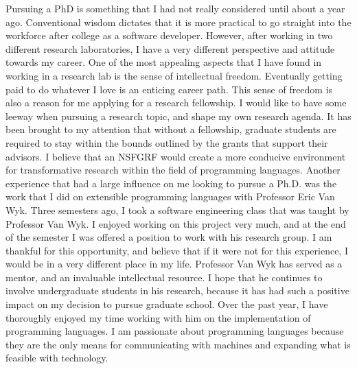 \documentclass[a4paper,12pt]{article}
\newcommand{\tab}{\hspace*{2em}}
\begin{document}
Pursuing a PhD is something that I had not really considered until about a year ago. Conventional wisdom dictates that it is  more practical to go straight into the workforce after college as a software developer. However, after working in two different research laboratories, I have a very different perspective and attitude towards my career. One of the most appealing aspects that I have found in working in a research lab is the sense of intellectual freedom.  Eventually getting paid to do whatever I love is an enticing career path. This sense of freedom is also a reason for me applying for a research fellowship. I would like to have some leeway when pursuing a research topic, and shape my own research agenda. It has been brought to my attention that without a fellowship, graduate students are required to stay within the bounds outlined by the grants that support their advisors. I believe that an NSFGRF would create a more conducive environment for transformative research within the field of programming languages.
\newline
\tab Another experience that had a large influence on me looking to pursue a Ph.D. was the work that I did on extensible programming languages with Professor Eric Van Wyk. Three semesters ago, I took a software engineering class that was taught by Professor Van Wyk. I enjoyed working on this project very much, and at the end of the semester I was offered a position to work with his research group. I am thankful for this opportunity, and believe that if it were not for this experience, I would be in a very different place in my life. Professor Van Wyk has served as a mentor, and an invaluable intellectual resource. I hope that he continues to involve undergraduate students in his research, because it has had such a positive impact on my decision to pursue graduate school. Over the past year, I have thoroughly enjoyed my time working with him on the implementation of programming languages. I am passionate about programming languages because they are the only means for communicating with machines and expanding what is feasible with technology. 
\newline
\end{document}
